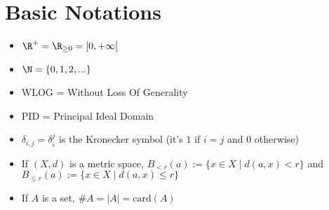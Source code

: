 \chapter{Basic Notations}
		\begin{itemize}
			\item $\R^+ = \R_{\geq 0} = [0, +\infty[$
			\item $\N = \{0, 1, 2, ...\}$ 
			\item WLOG = Without Loss Of Generality
			\item PID = Principal Ideal Domain
			\item $\delta_{i, j} = \delta_i^j$ is the Kronecker symbol (it's $1$ if $i=j$ and $0$ otherwise)
			\item If $(X, d)$ is a metric space, $B_{<r}(a) := \{x \in X \mid d(a, x) < r \}$ and $B_{\leq r}(a) := \{x \in X \mid d(a, x) \leq r \}$
			\item If $A$ is a set, $\#A = |A| = \text{card}(A)$
		\end{itemize}
